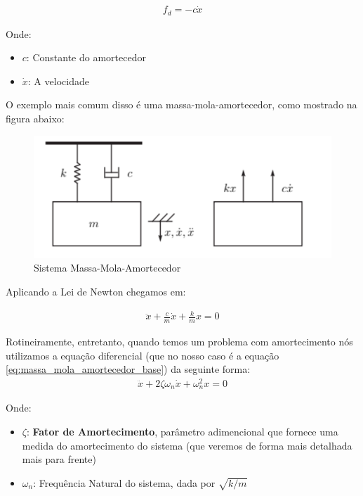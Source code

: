 \documentclass{article}
\begin{document}
                \begin{align}
                    f_d = -c \dot x \label{eq:forca_amortecedor_viscoso}
                \end{align}

                Onde:
                \begin{itemize}
                    \item $c$: Constante do amortecedor
                    \item $\dot x$: A velocidade
                \end{itemize}

                O exemplo mais comum disso é uma massa-mola-amortecedor, como mostrado na figura abaixo:
                \begin{figure}[h]
                    \centering
                    \includegraphics[width=.4\textwidth]{imgs/sis_massa_mola_amortecedor.png}
                    \caption{Sistema Massa-Mola-Amortecedor}
                \end{figure}

                Aplicando a Lei de Newton chegamos em:

                \begin{align}
                    \ddot x + \frac{c}{m}\dot x + \frac{k}{m}x = 0 \label{eq:massa_mola_amortecedor_base}
                \end{align}

                Rotineiramente, entretanto, quando temos um problema com amortecimento nós utilizamos a equação diferencial (que no nosso caso é a equação \ref{eq:massa_mola_amortecedor_base}) da seguinte
                forma:
                \begin{align}
                    \ddot x + 2\zeta \omega_n\dot x + \omega_n^2 x = 0 \label{eq:massa_mola_amortecedor_classica}
                \end{align}

                Onde:
                \begin{itemize}
                    \item $\zeta$: \textbf{Fator de Amortecimento}, parâmetro adimencional que fornece uma medida do amortecimento do sistema (que veremos de forma mais detalhada mais para frente) 
                    \item $\omega_n$: Frequência Natural do sistema, dada por $\sqrt{k/m}$
                \end{itemize}
\end{document}
